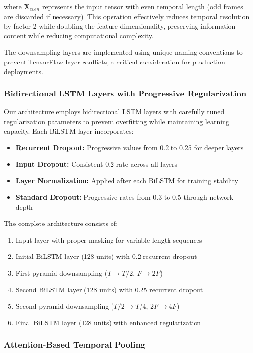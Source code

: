 \documentclass[conference]{IEEEtran}
\begin{document}
where $\mathbf{X}_{even}$ represents the input tensor with even temporal length (odd frames are discarded if necessary). This operation effectively reduces temporal resolution by factor 2 while doubling the feature dimensionality, preserving information content while reducing computational complexity.

The downsampling layers are implemented using unique naming conventions to prevent TensorFlow layer conflicts, a critical consideration for production deployments.

\subsubsection{Bidirectional LSTM Layers with Progressive Regularization}

Our architecture employs bidirectional LSTM layers with carefully tuned regularization parameters to prevent overfitting while maintaining learning capacity. Each BiLSTM layer incorporates:

\begin{itemize}
\item \textbf{Recurrent Dropout:} Progressive values from 0.2 to 0.25 for deeper layers
\item \textbf{Input Dropout:} Consistent 0.2 rate across all layers  
\item \textbf{Layer Normalization:} Applied after each BiLSTM for training stability
\item \textbf{Standard Dropout:} Progressive rates from 0.3 to 0.5 through network depth
\end{itemize}

The complete architecture consists of:
\begin{enumerate}
\item Input layer with proper masking for variable-length sequences
\item Initial BiLSTM layer (128 units) with 0.2 recurrent dropout
\item First pyramid downsampling ($T \rightarrow T/2$, $F \rightarrow 2F$)
\item Second BiLSTM layer (128 units) with 0.25 recurrent dropout  
\item Second pyramid downsampling ($T/2 \rightarrow T/4$, $2F \rightarrow 4F$)
\item Final BiLSTM layer (128 units) with enhanced regularization
\end{enumerate}

\subsubsection{Attention-Based Temporal Pooling}
\end{document}
